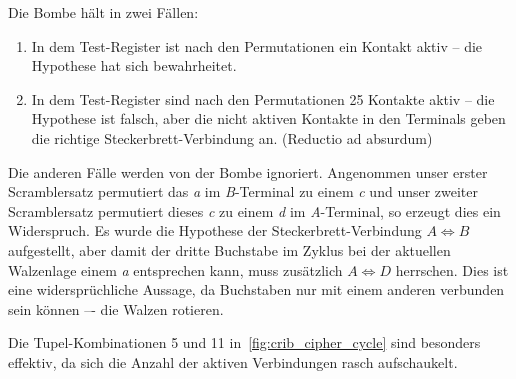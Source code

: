 Die Bombe hält in zwei Fällen:
\begin{enumerate}
	\item In dem Test-Register ist nach den Permutationen ein Kontakt aktiv – die Hypothese hat sich bewahrheitet.
	\item In dem Test-Register sind nach den Permutationen 25 Kontakte aktiv – die Hypothese ist falsch, aber die nicht aktiven Kontakte in den Terminals geben die \glqq richtige\grqq{} Steckerbrett-Verbindung an. (Reductio ad absurdum)
\end{enumerate}

Die anderen Fälle werden von der Bombe ignoriert.
Angenommen unser erster Scramblersatz permutiert das \emph{a} im \emph{B}-Terminal zu einem \emph{c} und unser zweiter Scramblersatz permutiert dieses \emph{c} zu einem \emph{d} im \emph{A}-Terminal, so erzeugt dies ein Widerspruch.
Es wurde die Hypothese der Steckerbrett-Verbindung $A \Leftrightarrow B$ aufgestellt, aber damit der dritte Buchstabe im Zyklus bei der aktuellen Walzenlage einem \emph{a} entsprechen kann, muss zusätzlich $A \Leftrightarrow D$ herrschen.
Dies ist eine widersprüchliche Aussage, da Buchstaben nur mit einem anderen verbunden sein können –- die Walzen rotieren.

Die Tupel-Kombinationen 5 und 11 in~\cref{fig:crib_cipher_cycle} sind besonders effektiv, da sich die Anzahl der aktiven Verbindungen rasch \glqq aufschaukelt\grqq.


